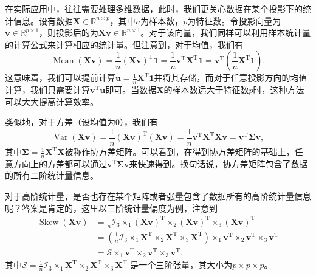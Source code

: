在实际应用中，往往需要处理多维数据，此时，我们更关心数据在某个投影下的统计信息。设有数据\( \mathbf{X} \in \mathbb{R}^{n \times p} \)，其中\( n \)为样本数，\( p \)为特征数。令投影向量为\( \bm{v} \in \mathbb{R}^{p \times 1} \)，则投影后的为\( \mathbf{X} \bm{v} \in \mathbb{R}^{n \times 1} \)。对于该向量，我们同样可以利用样本统计量的计算公式来计算相应的统计量。但注意到，对于均值，我们有
\[
    \operatorname{Mean}(\mathbf{X} \bm{v}) = \frac{1}{n} \left( \mathbf{X} \bm{v} \right)^{\mathrm{T}} \bm{1} = \frac{1}{n} \bm{v}^{\mathrm{T}} \mathbf{X}^{\mathrm{T}} \bm{1} = \bm{v}^{\mathrm{T}} \left( \frac{1}{n} \mathbf{X}^{\mathrm{T}} \bm{1} \right).
\]
这意味着，我们可以提前计算\(\bm{u} =  \frac{1}{n} \mathbf{X}^{\mathrm{T}} \bm{1}\)并将其存储，而对于任意投影方向的均值计算，我们只需要计算\( \bm{v}^{\mathrm{T}} \bm{u} \)即可。当数据\( \mathbf{X} \)的样本数远大于特征数\( p \)时，这种方法可以大大提高计算效率。

类似地，对于方差（设均值为0），我们有
\[
    \operatorname{Var}(\mathbf{X} \bm{v}) = \frac{1}{n} \left( \mathbf{X} \bm{v} \right)^{\mathrm{T}} \left( \mathbf{X} \bm{v} \right) = \frac{1}{n} \bm{v}^{\mathrm{T}} \mathbf{X}^{\mathrm{T}} \mathbf{X} \bm{v} = \bm{v}^{\mathrm{T}} \mathbf{\Sigma} \bm{v},
\]
其中\( \mathbf{\Sigma} = \frac{1}{n} \mathbf{X}^{\mathrm{T}} \mathbf{X} \)被称作协方差矩阵。可以看到，在得到协方差矩阵的基础上，任意方向上的方差都可以通过\( \bm{v}^{\mathrm{T}} \mathbf{\Sigma} \bm{v} \)来快速得到。换句话说，协方差矩阵包含了数据的所有二阶统计量信息。

对于高阶统计量，是否也存在某个矩阵或者张量包含了数据所有的高阶统计量信息呢？答案是肯定的，这里以三阶统计量偏度为例，注意到
\[
    \begin{split}
        \operatorname{Skew}(\mathbf{X} \bm{v}) & = \frac{1}{n} \mathcal{I}_3 \times_1 (\mathbf{X} \bm{v})^{\mathrm{T}} \times_2 (\mathbf{X} \bm{v})^{\mathrm{T}} \times_3 (\mathbf{X} \bm{v})^{\mathrm{T}}                                                                             \\
                                               & =  \left( \frac{1}{n} \mathcal{I}_3 \times_1 \mathbf{X}^{\mathrm{T}} \times_2 \mathbf{X}^{\mathrm{T}} \times_3 \mathbf{X}^{\mathrm{T}} \right) \times_1 \bm{v}^{\mathrm{T}} \times_2 \bm{v}^{\mathrm{T}} \times_3 \bm{v}^{\mathrm{T}} \\
                                               & = \mathcal{S} \times_1 \bm{v}^{\mathrm{T}} \times_2 \bm{v}^{\mathrm{T}} \times_3 \bm{v}^{\mathrm{T}},
    \end{split}
\]
其中\( \mathcal{S} = \frac{1}{n} \mathcal{I}_3 \times_1 \mathbf{X}^{\mathrm{T}} \times_2 \mathbf{X}^{\mathrm{T}} \times_3 \mathbf{X}^{\mathrm{T}} \) 是一个三阶张量，其大小为\( p \times p \times p \)。

